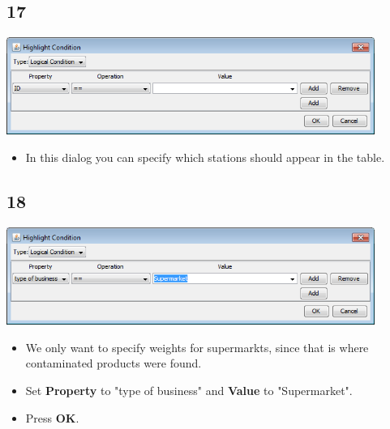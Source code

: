 \documentclass{beamer}
\begin{document}
\subsection{17}
\begin{frame}
	\begin{center}
  		\includegraphics[width=0.9\textwidth]{17.png}
	\end{center}
	\begin{itemize}
		\item In this dialog you can specify which stations should appear in the table.
	\end{itemize}
\end{frame}

\subsection{18}
\begin{frame}
	\begin{center}
  		\includegraphics[width=0.9\textwidth]{18.png}
	\end{center}
	\begin{itemize}
		\item We only want to specify weights for supermarkts, since that is where contaminated products were found.
		\item Set \textbf{Property} to "type of business" and \textbf{Value} to "Supermarket".
		\item Press \textbf{OK}.
	\end{itemize}
\end{frame}
\end{document}

